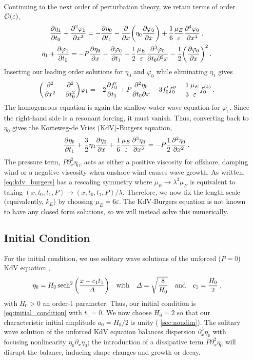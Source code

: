 \documentclass{jfm}
\renewcommand*{\epsilon}{\varepsilon}
\begin{document}
Continuing to the next order of perturbation theory, we retain terms of
order $\order{\epsilon}$,
\begin{gather}
    \pdv{\eta_1}{t_0} + \pdv[2]{\varphi_{1}}{x} =
      -\pdv{\eta_0}{t_1} - \pdv{x} \pqty{\eta_0 \pdv{\varphi_0}{x}} +
      \frac{1}{6} \frac{\mu_E}{\epsilon} \pdv[4]{\varphi_0}{x} \,,
  \\
    \eta_1 + \pdv{\varphi_1}{t_0} = -P \pdv{\eta_0}{x} -\pdv{\varphi_0}{t_1}
      + \frac{1}{2} \frac{\mu_E}{\epsilon} \frac{\partial^3 \varphi_0}
        {\partial t_0 \partial^2 x}
      - \frac{1}{2} \pqty{ \pdv{\varphi_0}{x} }^2
  \,.
\end{gather}
Inserting our leading order solutions for $\eta_0$ and $\varphi_0$ while
eliminating $\eta_1$ gives
\begin{equation}
  \pqty{\pdv[2]{x} - \pdv[2]{t_0}} \varphi_1 = -2 \pdv{f_0'}{t_1} +
    P\pdv{\eta_0}{t_0}{x} - 3 f_0' f_0'' - \frac{1}{3} \frac{\mu_E}{\epsilon}
    f_0^{(4)} \,.
\end{equation}
The homogeneous equation is again the shallow-water wave equation for
$\varphi_1$.
Since the right-hand side is a resonant forcing, it must vanish.
Thus, converting back to $\eta_0$ gives the Korteweg-de Vries
(KdV)-Burgers equation,
\begin{equation}
  \pdv{\eta_0}{t_1} + \frac{3}{2}
    \eta_0 \pdv{\eta_0}{x} + \frac{1}{6} \frac{\mu_E}{\epsilon}
    \pdv[3]{\eta_0}{x} = -P \frac{1}{2} \pdv[2]{\eta_0}{x} \,.
  \label{eq:kdv_burgers}
\end{equation}
The pressure term, $P \partial^2_x \eta_0$, acts as either a positive
viscosity for offshore, damping wind or a negative viscosity when
onshore wind causes wave growth.
As written, \cref{eq:kdv_burgers} has a rescaling symmetry where $\mu_E
\to \lambda^2 \mu_E$ is equivalent to taking $(x,t_0,t_1,P) \to
(x,t_0,t_1,P)/\lambda$.
Therefore, we now fix the length scale (equivalently, $k_E$) by choosing
$\mu_E = 6 \epsilon$.
The KdV-Burgers equation is not known to have any closed form solutions,
so we will instead solve this numerically.

\subsection{\label{sec:initial} Initial Condition}
For the initial condition, we use solitary wave solutions of the unforced
($P=0$) KdV equation \citep[\eg][]{mei2005nonlinear},
\begin{equation}
  \eta_0 = H_0 \sech^2\pqty{\frac{x - c_1 t_1}{\Delta}}
  \qq{with}
  \Delta = \sqrt{\frac{8}{H_0}}
  \qq{and}
  c_1 = \frac{H_0}{2} \,,
  \label{eq:initial_condition}
\end{equation}
with $H_0>0$ an order-1 parameter.
Thus, our initial condition is \cref{eq:initial_condition} with $t_1=0$.
We now choose $H_0 = 2$ so that our characteristic initial amplitude
$a_0 = H_0/2$ is unity (\cf{} \cref{sec:nondim}).
The solitary wave solution of the unforced KdV equation balances
dispersion $\partial_x^3 \eta_0$ with focusing nonlinearity $\eta_0
\partial_x \eta_0$; the introduction of a dissipative term $P
\partial_x^2 \eta_0$ will disrupt the balance, inducing shape changes
and growth or decay.
\end{document}
